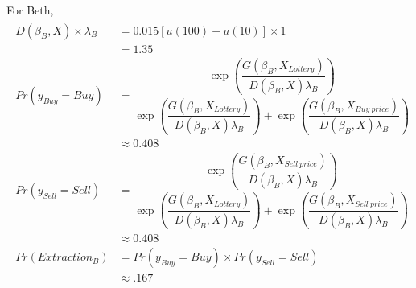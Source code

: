 \documentclass[11pt,a4paper]{report}
\newcommand\Prob{\ensuremath{\mathit{Pr}}}  %
\begin{document}
\noindent For Beth,
\begin{align}
	\label{eq2:Beth}
	\begin{split}
	D(\beta_B,X) \times \lambda_B &= 0.015[u(100) - u(10)] \times 1\\
	&= 1.35 \\
	{\Prob}(y_{\mathit{Buy}} = \mathit{Buy}) &=\dfrac{\exp\!\left( \dfrac{ G(\beta_B,X_{\mathit{Lottery}}) }{ D(\beta_B,X)\lambda_B }  \right)}{ \exp\!\left( \dfrac{ G(\beta_B,X_{\mathit{Lottery}}) }{ D(\beta_B,X)\lambda_B }  \right) + \exp\!\left( \dfrac{ G(\beta_B,X_{\mathit{Buy\ price}}) }{ D(\beta_B,X)\lambda_B }  \right)  }\\[0.5ex]
	&\approx 0.408 \\
	{\Prob}(y_{\mathit{Sell}} = \mathit{Sell}) &=\dfrac{\exp\!\left( \dfrac{ G(\beta_B,X_{\mathit{Sell\ price}}) }{ D(\beta_B,X)\lambda_B }  \right)}{ \exp\!\left( \dfrac{ G(\beta_B,X_{\mathit{Lottery}}) }{ D(\beta_B,X)\lambda_B }  \right) + \exp\!\left( \dfrac{ G(\beta_B,X_{\mathit{Sell\ price}}) }{ D(\beta_B,X)\lambda_B }  \right)  }\\[0.5ex]
	&\approx 0.408 \\
	{\Prob}(\mathit{Extraction}_B) &= {\Prob}(y_{\mathit{Buy}} = \mathit{Buy}) \times {\Prob}(y_{\mathit{Sell}} = \mathit{Sell})\\
	&\approx .167
	\end{split}
\end{align}
\end{document}
